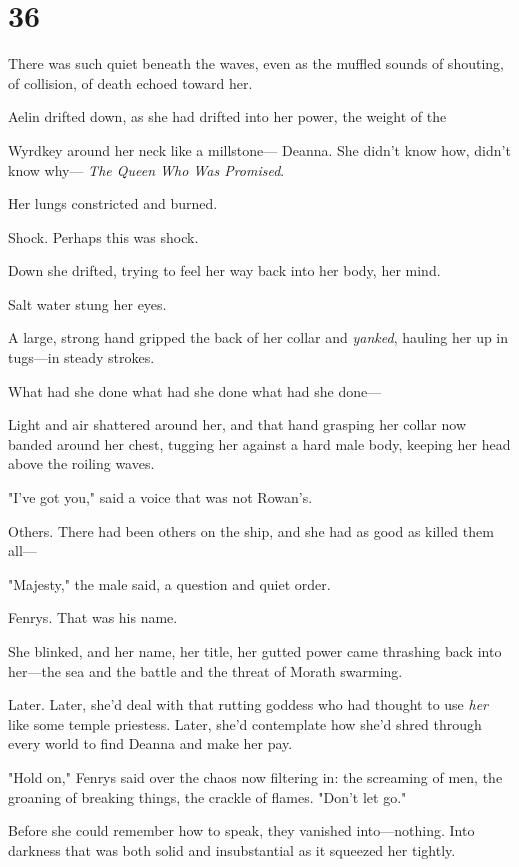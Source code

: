
\chapter{36}

There was such quiet beneath the waves, even as the muffled sounds of shouting, of collision, of death echoed toward her.

Aelin drifted down, as she had drifted into her power, the weight of the

Wyrdkey around her neck like a millstone--- Deanna. She didn't know how, didn't know why--- \emph{The Queen Who Was Promised}.

Her lungs constricted and burned.

Shock. Perhaps this was shock.

Down she drifted, trying to feel her way back into her body, her mind.

Salt water stung her eyes.

A large, strong hand gripped the back of her collar and \emph{yanked}, hauling her up in tugs---in steady strokes.

What had she done what had she done what had she done---

Light and air shattered around her, and that hand grasping her collar now banded around her chest, tugging her against a hard male body, keeping her head above the roiling waves.

"I've got you," said a voice that was not Rowan's.

Others. There had been others on the ship, and she had as good as killed them all---

"Majesty," the male said, a question and quiet order.

Fenrys. That was his name.

She blinked, and her name, her title, her gutted power came thrashing back into her---the sea and the battle and the threat of Morath swarming.

Later. Later, she'd deal with that rutting goddess who had thought to use \emph{her} like some temple priestess. Later, she'd contemplate how she'd shred through every world to find Deanna and make her pay.

"Hold on," Fenrys said over the chaos now filtering in: the screaming of men, the groaning of breaking things, the crackle of flames. "Don't let go."

Before she could remember how to speak, they vanished into---nothing. Into darkness that was both solid and insubstantial as it squeezed her tightly.


